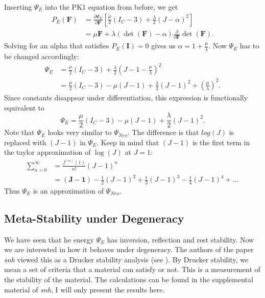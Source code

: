 Inserting $\Psi_E$ into the PK1 equation from before, we get
\begin{align*}
P_{E}(\mathbf{F}) &= \frac{\partial \Psi_{E}}{\partial \mathbf{F}} \left[ \frac{\mu}{2}\left(I_{C}-3\right) +\frac{\lambda}{2}(J-\alpha)^{2} \right] \\
&= \mu \mathbf{F} + \lambda (\operatorname{det}(\mathbf{F})-\alpha)  \frac{\partial}{\partial \mathbf{F}} \operatorname{det}(\mathbf{F}).
\end{align*}
Solving for an alpha that satisfies $P_{E}(\mathbf{I})=0$ gives us $\alpha=1+\frac{\mu}{\lambda}$. Now $\Psi_{E}$ has to be changed accordingly:
\begin{align*}
\Psi_{E} &= \frac{\mu}{2}\left(I_{C}-3\right) +\frac{\lambda}{2}(J-1-\frac{\mu}{\lambda})^{2} \\
&= \frac{\mu}{2}\left(I_{C}-3\right) - \mu\left(J-1\right) + \frac{\lambda}{2}(J-1)^{2} + \left(\frac{\mu}{\lambda}\right)^{2}.
\end{align*}
Since constants disappear under differentiation, this expression is functionally equivalent to 
\[
\Psi_{E} = \frac{\mu}{2}\left(I_{C}-3\right) - \mu\left(J-1\right) + \frac{\lambda}{2}(J-1)^{2}.
\]
Note that $\Psi_{E}$ looks very similar to $\Psi_{Neo}$. The difference is that $log(J)$ is replaced with $(J-1)$ in $\Psi_{E}$. Keep in mind that $(J-1)$ is the first term in the taylor approximation of $\operatorname{log}(J)$ at $J=1$:
\begin{align*}
\sum_{n=0}^{\infty} &= \frac{f^{(n)}(1)}{n!} (J-1)^{n} \\
&= \boldsymbol{(J-1)} - \frac{1}{2} (J-1)^{2} + \frac{1}{3} (J-1)^{3} -\frac{1}{4} (J-1)^{4} + \text{...}
\end{align*}
Thus $\Psi_{E}$ is an approximation of $\Psi_{Neo}$.


\subsection{Meta-Stability under Degeneracy}
We have seen that he energy $\Psi_{E}$ has inversion, reflection and rest stability. Now we are interested in how it behaves under degeneracy. The authors of the paper \textit{\acrshort{snh}} viewed this as a Drucker stability analysis (see \cite{bower2009applied}). By Drucker stability, we mean a set of criteria that a material can satisfy or not. This is a measurement of the stability of the material. The calculations can be found in the supplemental material of \textit{\acrshort{snh}}, I will only present the results here. 

